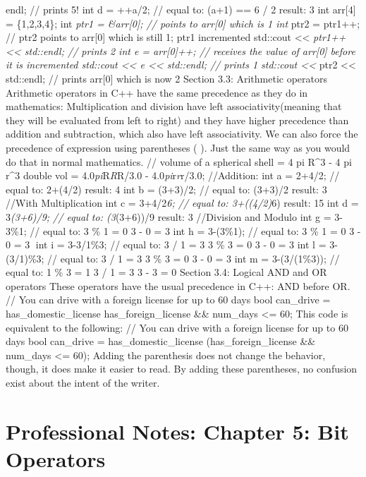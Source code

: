 endl; // prints 5! int d = ++a/2; // equal to: (a+1) == 6 / 2 result: 3
int arr{[}4{]} = \{1,2,3,4\}; int \emph{ptr1 = \&arr{[}0{]}; // points
to arr{[}0{]} which is 1 int }ptr2 = ptr1++; // ptr2 points to
arr{[}0{]} which is still 1; ptr1 incremented std::cout
\textless\textless{} \emph{ptr1++ \textless\textless{} std::endl; //
prints 2 int e = arr{[}0{]}++; // receives the value of arr{[}0{]}
before it is incremented std::cout \textless\textless{} e
\textless\textless{} std::endl; // prints 1 std::cout
\textless\textless{} }ptr2 \textless\textless{} std::endl; // prints
arr{[}0{]} which is now 2 Section 3.3: Arithmetic operators Arithmetic
operators in C++ have the same precedence as they do in mathematics:
Multiplication and division have left associativity(meaning that they
will be evaluated from left to right) and they have higher precedence
than addition and subtraction, which also have left associativity. We
can also force the precedence of expression using parentheses ( ). Just
the same way as you would do that in normal mathematics. // volume of a
spherical shell = 4 pi R\^{}3 - 4 pi r\^{}3 double vol =
4.0\emph{pi}R\emph{R}R/3.0 - 4.0\emph{pi}r\emph{r}r/3.0; //Addition: int
a = 2+4/2; // equal to: 2+(4/2) result: 4 int b = (3+3)/2; // equal to:
(3+3)/2 result: 3 //With Multiplication int c = 3+4/2\emph{6; // equal
to: 3+((4/2)}6) result: 15 int d = 3\emph{(3+6)/9; // equal to:
(3}(3+6))/9 result: 3 //Division and Modulo int g = 3-3\%1; // equal to:
3 \% 1 = 0 3 - 0 = 3 int h = 3-(3\%1); // equal to: 3 \% 1 = 0 3 - 0 = 3
int i = 3-3/1\%3; // equal to: 3 / 1 = 3 3 \% 3 = 0 3 - 0 = 3 int l =
3-(3/1)\%3; // equal to: 3 / 1 = 3 3 \% 3 = 0 3 - 0 = 3 int m =
3-(3/(1\%3)); // equal to: 1 \% 3 = 1 3 / 1 = 3 3 - 3 = 0 Section 3.4:
Logical AND and OR operators These operators have the usual precedence
in C++: AND before OR. // You can drive with a foreign license for up to
60 days bool can\_drive = has\_domestic\_license \textbar\textbar{}
has\_foreign\_license \&\& num\_days \textless= 60; This code is
equivalent to the following: // You can drive with a foreign license for
up to 60 days bool can\_drive = has\_domestic\_license
\textbar\textbar{} (has\_foreign\_license \&\& num\_days \textless= 60);
Adding the parenthesis does not change the behavior, though, it does
make it easier to read. By adding these parentheses, no confusion exist
about the intent of the writer.

\hypertarget{professional-notes-chapter-5-bit-operators}{%
\section{Professional Notes: Chapter 5: Bit
Operators}\label{professional-notes-chapter-5-bit-operators}}

